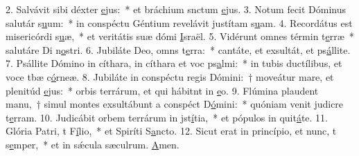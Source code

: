 2. Salvávit sibi déxter \uline{e}jus:~* et bráchium snctum \uline{e}jus.
3. Notum fecit Dóminus salutár s\uline{u}um:~* in conspéctu Géntium revelávit justítam s\uline{u}am.
4. Recordátus est misericórdi s\uline{u}æ,~* et veritátis suæ dómi \uline{I}sraël.
5. Vidérunt omnes términ t\uline{e}rræ~* salutáre Di n\uline{o}stri.
6. Jubiláte Deo, omns t\uline{e}rra:~* cantáte, et exsultát, et ps\uline{á}llite.
7. Psállite Dómino in cíthara, in cíthara et voc ps\uline{a}lmi:~* in tubis ductílibus, et voce tbæ c\uline{ó}rneæ.
8. Jubiláte in conspéctu regis Dómini:~† moveátur mare, et plenitúd \uline{e}jus:~* orbis terrárum, et qui hábitnt in \uline{e}o.
9. Flúmina plaudent manu,~† simul montes exsultábunt a conspéct D\uline{ó}mini:~* quóniam venit judicre t\uline{e}rram.
10. Judicábit orbem terrárum in jst\uline{í}tia,~* et pópulos in quit\uline{á}te.
11. Glória Patri, t F\uline{í}lio,~* et Spiríti S\uline{a}ncto.
12. Sicut erat in princípio, et nunc, t s\uline{e}mper,~* et in sǽcula sæculrum. \uline{A}men.
